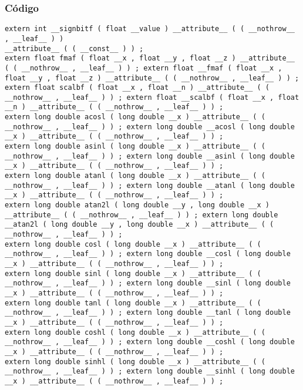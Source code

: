 \documentclass{beamer}
\begin{document}
\begin{frame}[fragile]
\frametitle{C\'odigo}
\begin{verbatim}
extern int __signbitf ( float __value ) __attribute__ ( ( __nothrow__ , __leaf__ ) ) 
__attribute__ ( ( __const__ ) ) ; 
extern float fmaf ( float __x , float __y , float __z ) __attribute__ ( ( __nothrow__ , __leaf__ ) ) ; extern float __fmaf ( float __x , float __y , float __z ) __attribute__ ( ( __nothrow__ , __leaf__ ) ) ; 
extern float scalbf ( float __x , float __n ) __attribute__ ( ( __nothrow__ , __leaf__ ) ) ; extern float __scalbf ( float __x , float __n ) __attribute__ ( ( __nothrow__ , __leaf__ ) ) ; 
extern long double acosl ( long double __x ) __attribute__ ( ( __nothrow__ , __leaf__ ) ) ; extern long double __acosl ( long double __x ) __attribute__ ( ( __nothrow__ , __leaf__ ) ) ; 
extern long double asinl ( long double __x ) __attribute__ ( ( __nothrow__ , __leaf__ ) ) ; extern long double __asinl ( long double __x ) __attribute__ ( ( __nothrow__ , __leaf__ ) ) ; 
extern long double atanl ( long double __x ) __attribute__ ( ( __nothrow__ , __leaf__ ) ) ; extern long double __atanl ( long double __x ) __attribute__ ( ( __nothrow__ , __leaf__ ) ) ; 
extern long double atan2l ( long double __y , long double __x ) __attribute__ ( ( __nothrow__ , __leaf__ ) ) ; extern long double __atan2l ( long double __y , long double __x ) __attribute__ ( ( __nothrow__ , __leaf__ ) ) ; 
extern long double cosl ( long double __x ) __attribute__ ( ( __nothrow__ , __leaf__ ) ) ; extern long double __cosl ( long double __x ) __attribute__ ( ( __nothrow__ , __leaf__ ) ) ; 
extern long double sinl ( long double __x ) __attribute__ ( ( __nothrow__ , __leaf__ ) ) ; extern long double __sinl ( long double __x ) __attribute__ ( ( __nothrow__ , __leaf__ ) ) ; 
extern long double tanl ( long double __x ) __attribute__ ( ( __nothrow__ , __leaf__ ) ) ; extern long double __tanl ( long double __x ) __attribute__ ( ( __nothrow__ , __leaf__ ) ) ; 
extern long double coshl ( long double __x ) __attribute__ ( ( __nothrow__ , __leaf__ ) ) ; extern long double __coshl ( long double __x ) __attribute__ ( ( __nothrow__ , __leaf__ ) ) ; 
extern long double sinhl ( long double __x ) __attribute__ ( ( __nothrow__ , __leaf__ ) ) ; extern long double __sinhl ( long double __x ) __attribute__ ( ( __nothrow__ , __leaf__ ) ) ; 
\end{verbatim}
\end{frame}
\end{document}
